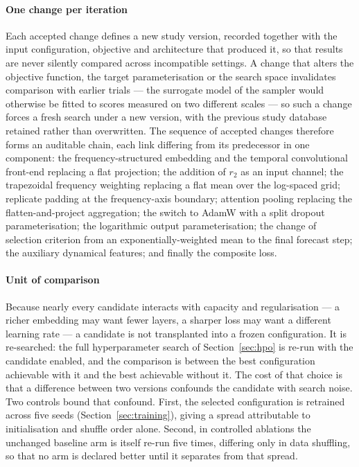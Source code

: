 \paragraph{One change per iteration}
Each accepted change defines a new study version, recorded together with the input configuration, objective and architecture that produced it, so that results are never silently compared across incompatible settings. A change that alters the objective function, the target parameterisation or the search space invalidates comparison with earlier trials — the surrogate model of the sampler would otherwise be fitted to scores measured on two different scales — so such a change forces a fresh search under a new version, with the previous study database retained rather than overwritten. The sequence of accepted changes therefore forms an auditable chain, each link differing from its predecessor in one component: the frequency-structured embedding and the temporal convolutional front-end replacing a flat projection; the addition of $r_2$ as an input channel; the trapezoidal frequency weighting replacing a flat mean over the log-spaced grid; replicate padding at the frequency-axis boundary; attention pooling replacing the flatten-and-project aggregation; the switch to AdamW with a split dropout parameterisation; the logarithmic output parameterisation; the change of selection criterion from an exponentially-weighted mean to the final forecast step; the auxiliary dynamical features; and finally the composite loss.

\paragraph{Unit of comparison}
Because nearly every candidate interacts with capacity and regularisation — a richer embedding may want fewer layers, a sharper loss may want a different learning rate — a candidate is not transplanted into a frozen configuration. It is re-searched: the full hyperparameter search of Section~\ref{sec:hpo} is re-run with the candidate enabled, and the comparison is between the best configuration achievable with it and the best achievable without it. The cost of that choice is that a difference between two versions confounds the candidate with search noise. Two controls bound that confound. First, the selected configuration is retrained across five seeds (Section~\ref{sec:training}), giving a spread attributable to initialisation and shuffle order alone. Second, in controlled ablations the unchanged baseline arm is itself re-run five times, differing only in data shuffling, so that no arm is declared better until it separates from that spread.

